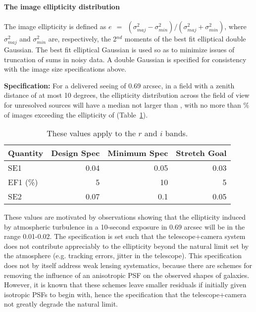 

\paragraph{The image ellipticity distribution\\}

The image ellipticity is defined as $e ~~=~~ (\sigma^{2}_{maj} -
\sigma^{2}_{min}) / (\sigma^{2}_{maj} + \sigma^{2}_{min}) $, where
$\sigma^{2}_{maj}$ and $\sigma^{2}_{min}$ are, respectively, the
2$^{nd}$ moments of the best fit elliptical double Gaussian.  The best
fit elliptical Gaussian is used so as to minimize issues of truncation
of sums in noisy data.  A double Gaussian is specified for consistency
with the image size specifications above.

{\bf Specification:} For a delivered seeing of 0.69 arcsec, in a field
with a zenith distance of at most 10 degrees, the ellipticity
distribution across the field of view for unresolved sources will have
a median not larger than
,
with no more than
\% of images exceeding the ellipticity of
(Table~\ref{TellipS}).

\begin{table}[h]
\begin{tabular}{|l|r|r|r|}
\hline
Quantity       & Design Spec & Minimum Spec & Stretch Goal \\
\hline
      SE1      &    0.04      &     0.05     &       0.03    \\
      EF1 (\%) &      5       &      10      &         5     \\
      SE2      &    0.07      &     0.1      &       0.05    \\
\hline
\end{tabular}
\caption{These values apply to the $r$ and $i$ bands.}
\label{TellipS}
\end{table}

These values are motivated by observations showing that the
ellipticity induced by atmospheric turbulence in a 10-second exposure
in 0.69 arcsec will be in the range 0.01-0.02.  The specification is
set such that the telescope+camera system does not contribute
appreciably to the
ellipticity beyond the natural limit set by the atmosphere (e.g. tracking
errors, jitter in the telescope).  This
specification does not by itself address weak lensing systematics,
because there are schemes for removing the influence of an anisotropic
PSF on the observed shapes of galaxies.  However, it is known that
these schemes leave smaller residuals if initially given isotropic
PSFs to begin with, hence the specification that the telescope+camera
not greatly degrade the natural limit.


